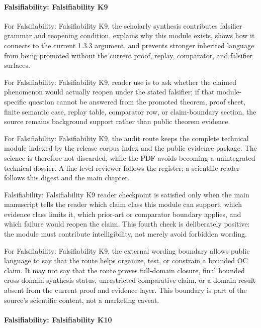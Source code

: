 \paragraph{Falsifiability: Falsifiability K9}

For Falsifiability: Falsifiability K9, the scholarly synthesis contributes falsifier grammar and reopening condition, explains why this module exists, shows how it connects to the current 1.3.3 argument, and prevents stronger inherited language from being promoted without the current proof, replay, comparator, and falsifier surfaces.


For Falsifiability: Falsifiability K9, reader use is to ask whether the claimed phenomenon would actually reopen under the stated falsifier; if that module-specific question cannot be answered from the promoted theorem, proof sheet, finite semantic case, replay table, comparator row, or claim-boundary section, the source remains background support rather than public theorem evidence.


For Falsifiability: Falsifiability K9, the audit route keeps the complete technical module indexed by the release corpus index and the public evidence package. The science is therefore not discarded, while the PDF avoids becoming a unintegrated technical dossier. A line-level reviewer follows the register; a scientific reader follows this digest and the main chapter.


Falsifiability: Falsifiability K9 reader checkpoint is satisfied only when the main manuscript tells the reader which claim class this module can support, which evidence class limits it, which prior-art or comparator boundary applies, and which failure would reopen the claim. This fourth check is deliberately positive: the module must contribute intelligibility, not merely avoid forbidden wording.


For Falsifiability: Falsifiability K9, the external wording boundary allows public language to say that the route helps organize, test, or constrain a bounded OC claim. It may not say that the route proves full-domain closure, final bounded cross-domain synthesis status, unrestricted comparative claim, or a domain result absent from the current proof and evidence layer. This boundary is part of the source's scientific content, not a marketing caveat.


\paragraph{Falsifiability: Falsifiability K10}

